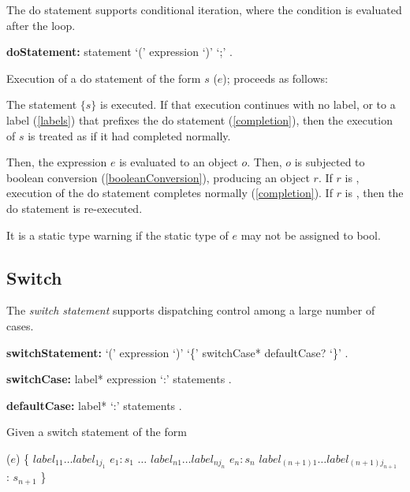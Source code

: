 \documentclass{article}
\newcommand{\code}[1]{{\sf #1}}
\begin{document}
\LMHash{}
The do statement supports conditional iteration, where the condition is evaluated after the loop.

\begin{grammar}
{\bf doStatement:}
    \DO{} statement \WHILE{} `(' expression `)' `{\escapegrammar ;}'%
      .
 \end{grammar}


\LMHash{}
Execution of a do statement of the form \code{\DO{} $s$ \WHILE{} ($e$);} proceeds as follows:

\LMHash{}
The statement $\{s\}$ is executed.
If that execution continues with no label, or to a label (\ref{labels}) that prefixes the do statement (\ref{completion}), then the execution of $s$ is treated as if it had completed normally.

\LMHash{}
Then, the expression $e$ is evaluated to an object $o$. Then, $o$ is subjected to boolean conversion (\ref{booleanConversion}), producing an object $r$.
If $r$ is \FALSE{}, execution of the do statement completes normally (\ref{completion}).
If $r$ is \TRUE{}, then the do statement is re-executed.

\LMHash{}
It is a static type warning if the static type of $e$ may not be assigned to \code{bool}.

\subsection{Switch}

\LMHash{}
The {\em switch statement} supports dispatching control among a large number of cases.

\begin{grammar}
{\bf switchStatement:}
      \SWITCH{} `(' expression `)' `\{' switchCase* defaultCase? `\}'%
    .


{\bf switchCase:}
      label* \CASE{} expression `{\escapegrammar :}' statements
    .

{\bf defaultCase:}
      label*  \DEFAULT{} `{\escapegrammar :}' statements
    .
 \end{grammar}

\LMHash{}
 Given a switch statement of the form

\begin{dartCode}
\SWITCH{} ($e$) \{
   $label_{11} \ldots label_{1j_1}$ \CASE{} $e_1: s_1$
   $\ldots$
   $label_{n1} \ldots label_{nj_n}$ \CASE{} $e_n: s_n$
   $label_{(n+1)1} \ldots label_{(n+1)j_{n+1}}$ \DEFAULT{}: $s_{n+1}$
\}
\end{dartCode}
\end{document}
